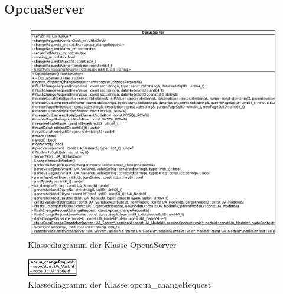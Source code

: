 \subsection{OpcuaServer}
\begin{figure}[ht]
  \centering
  \includegraphics[width=\textwidth]{content/hauptteil/umsetzungPoC/backend/uml/classesOfOverview/OpcuaServer.pdf}
  \caption{Klassediagramm der Klasse OpcuaServer}
  \label{fig:backend:classDiag:OpcuaServer}
\end{figure}
\begin{figure}[ht]
  \centering
  \includegraphics[width=0.2\textwidth]{content/hauptteil/umsetzungPoC/backend/uml/classesOfOverview/opcua_changeRequest.pdf}
  \caption{Klassediagramm der Klasse opcua\_changeRequest}
  \label{fig:backend:classDiag:opcuaCR}
\end{figure}




